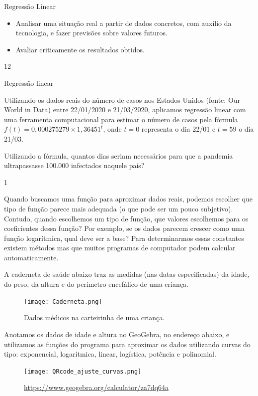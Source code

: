 \begin{objectives}{Regressão Linear}
{
	\begin{itemize}
	\item Analisar uma situação real a partir de dados concretos, com auxilio da tecnologia, e fazer previsões sobre valores futuros.
	\item Avaliar criticamente os resultados obtidos.
	\end{itemize}
}{1}{2}
\end{objectives}
\begin{answer}{Regressão linear}
{
	Utilizando os dados reais do número de casos nos Estados Unidos (fonte: Our World in Data) entre 22/01/2020 e 21/03/2020, aplicamos regressão linear com uma ferramenta computacional para estimar o número de casos pela fórmula $f(t) = 0{,}000275279 \times 1{,}36451^t$, onde $t=0$ representa o dia 22/01 e $t= 59$ o dia 21/03. %

	Utilizando a fórmula, quantos dias seriam necessários para que a pandemia ultrapassasse 100.000 infectados naquele país?
}{1}
\end{answer}



Quando buscamos uma função para aproximar dados reais, podemos escolher que tipo de função parece mais adequada (o que pode ser um pouco subjetivo). Contudo, quando escolhemos um tipo de função, que valores escolhemos para os coeficientes dessa função? Por exemplo, se os dados parecem crescer como uma função logarítmica, qual deve ser a base? Para determinarmos essas constantes existem métodos mas que muitos programas de computador podem calcular automaticamente.

A caderneta de saúde abaixo traz as medidas (nas datas especificadas) da idade, do peso, da altura e do perímetro encefálico de uma criança.

\begin{figure}[H]
\centering

\texttt{[image: Caderneta.png]}
\caption{Dados médicos na carteirinha de uma criança.}
\end{figure}

Anotamos os dados de idade e altura no GeoGebra, no endereço abaixo, e utilizamos as funções do programa para aproximar os dados utilizando curvas do tipo: exponencial, logarítmica, linear, logística, potência e polinomial.

\begin{figure}[H]
\centering

\texttt{[image: QRcode\_ajuste\_curvas.png]}

\url{https://www.geogebra.org/calculator/za7dq64a}
\end{figure}

